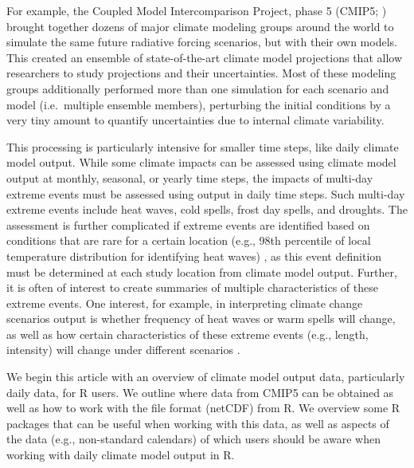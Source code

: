 For example, the Coupled Model Intercomparison Project, phase 5 (CMIP5;
\citet{taylor2012overview}) brought together dozens of major climate
modeling groups around the world to simulate the same future radiative
forcing scenarios, but with their own models. This created an ensemble
of state-of-the-art climate model projections that allow researchers to
study projections and their uncertainties. Most of these modeling groups
additionally performed more than one simulation for each scenario and
model (i.e.~multiple ensemble members), perturbing the initial
conditions by a very tiny amount to quantify uncertainties due to
internal climate variability.

This processing is particularly intensive for smaller time steps, like
daily climate model output. While some climate impacts can be assessed
using climate model output at monthly, seasonal, or yearly time steps,
the impacts of multi-day extreme events must be assessed using output in
daily time steps. Such multi-day extreme events include heat waves, cold
spells, frost day spells, and droughts. The assessment is further
complicated if extreme events are identified based on conditions that
are rare for a certain location (e.g., 98th percentile of local
temperature distribution for identifying heat waves) \citep{IPCCch1}, as
this event definition must be determined at each study location from
climate model output. Further, it is often of interest to create
summaries of multiple characteristics of these extreme events. One
interest, for example, in interpreting climate change scenarios output
is whether frequency of heat waves or warm spells will change, as well
as how certain characteristics of these extreme events (e.g., length,
intensity) will change under different scenarios \citep{IPCCch1}.

We begin this article with an overview of climate model output data,
particularly daily data, for R users. We outline where data from CMIP5
can be obtained as well as how to work with the file format (netCDF)
from R. We overview some R packages that can be useful when working with
this data, as well as aspects of the data (e.g., non-standard calendars)
of which users should be aware when working with daily climate model
output in R.

